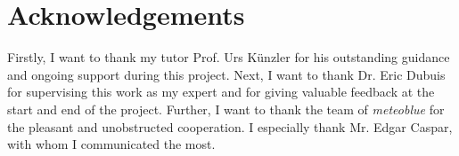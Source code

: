 \section*{Acknowledgements}
Firstly, I want to thank my tutor Prof. Urs K\"unzler for his outstanding guidance and ongoing support during this project.
\emptyline
Next, I want to thank Dr. Eric Dubuis for supervising this work as my expert and for giving valuable feedback at the start and end of the project.
\emptyline
Further, I want to thank the team of \emph{meteoblue} for the pleasant and unobstructed cooperation. I especially thank Mr. Edgar Caspar, with whom I communicated the most.